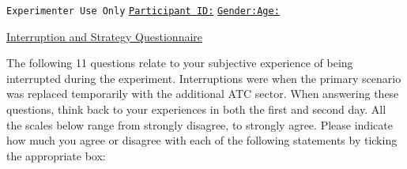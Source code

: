 \documentclass[12pt,fleqn]{scrreprt}
\begin{document}
\begin{framed}
\hspace{75pt}\centering\texttt{Experimenter Use Only}
		\newline
		\underline{\texttt{Participant ID:}}\hspace{15pt}\xxxbox \hspace{3cm} \texttt{\underline{Gender:}}\hspace{15pt}\bbox \hspace{3cm}\texttt{\underline{Age:}}\hspace{15pt}\xxbox
	\end{framed}
	
\begin{center}
	{\vspace{0.1cm}\large \underline{Interruption and Strategy Questionnaire}}
\end{center}
The following 11 questions relate to your subjective experience of being interrupted during the experiment. Interruptions were when the primary scenario was replaced temporarily with the additional ATC sector. When answering these questions, think back to your experiences in both the first and second day. All the scales below range from strongly disagree, to strongly agree. Please indicate how much you agree or disagree with each of the following statements by ticking the appropriate box:
\end{document}
